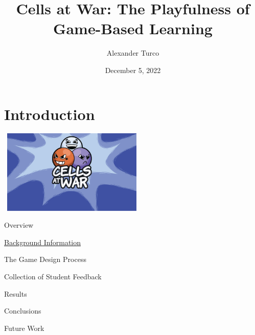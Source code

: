 \documentclass{beamer}
\title[BEAP Dec 2022]{Cells at War: The Playfulness of Game-Based Learning}
\author{Alexander Turco}
\date{December 5, 2022}
\begin{document}
	
	\section{Introduction}
	\begin{frame}
		\titlepage 
		\begin{center}
			\includegraphics[width=7cm, height=4cm]{cellsatwar.png}
		\end{center}
	\end{frame}
	
	\logo{}
	
	\begin{frame}{Overview}
		
		\begin{center}
		\begin{minipage}{6cm}
				
		  		\begin{block}{} \hyperlink{link1}{Background Information} \end{block}
		  		\begin{block}{} The Game Design Process \end{block}
		  		\begin{block}{} Collection of Student Feedback \end{block}
		  		\begin{block}{} Results \end{block}
		  		\begin{block}{} Conclusions \end{block}
		  		\begin{block}{} Future Work \end{block}

		\end{minipage}
		\end{center}
	
	\end{frame}
	
\end{document}
